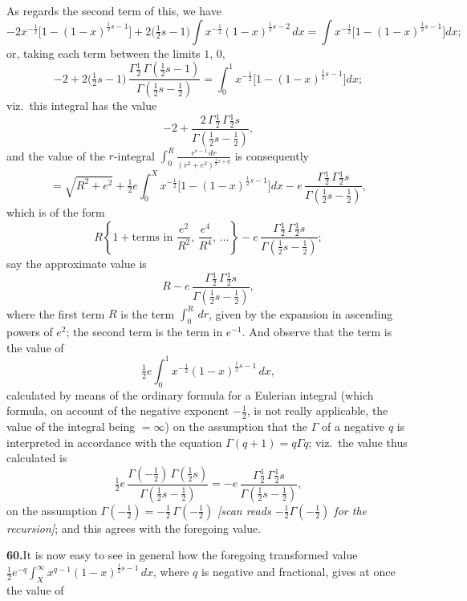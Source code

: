 \documentclass[11pt]{article}
\begin{document}
As regards the second term of this, we have
\[
-2x^{-\frac{1}{2}}\bigl[1-(1-x)^{\frac{1}{2}s-1}\bigr] + 2\bigl(\tfrac{1}{2}s-1\bigr)\int x^{-\frac{1}{2}}(1-x)^{\frac{1}{2}s-2}\,dx
= \int x^{-\frac{1}{2}}\bigl[1-(1-x)^{\frac{1}{2}s-1}\bigr]dx;
\]
or, taking each term between the limits $1$, $0$,
\[
-2 + 2\bigl(\tfrac{1}{2}s-1\bigr)\,\frac{\Gamma\frac{1}{2}\,\Gamma(\frac{1}{2}s-1)}{\Gamma(\frac{1}{2}s-\frac{1}{2})}
= \int_{0}^{1} x^{-\frac{1}{2}}\bigl[1-(1-x)^{\frac{1}{2}s-1}\bigr]dx;
\]
viz.\ this integral has the value
\[
-2 + \frac{2\,\Gamma\tfrac{1}{2}\,\Gamma\tfrac{1}{2}s}{\Gamma(\tfrac{1}{2}s-\tfrac{1}{2})},
\]
and the value of the $r$-integral $\displaystyle\int_{0}^{R}\frac{r^{s-1}\,dr}{(r^{2}+e^{2})^{\frac{1}{2}s+q}}$ is consequently
\[
= \sqrt{R^{2}+e^{2}} + \tfrac{1}{2}e\int_{0}^{X} x^{-\frac{1}{2}}\bigl[1-(1-x)^{\frac{1}{2}s-1}\bigr]dx
- e\,\frac{\Gamma\tfrac{1}{2}\,\Gamma\tfrac{1}{2}s}{\Gamma(\tfrac{1}{2}s-\tfrac{1}{2})},
\]
which is of the form
\[
R\left\{1 + \text{terms in } \frac{e^{2}}{R^{2}},\, \frac{e^{4}}{R^{4}},\,\ldots \right\} - e\,\frac{\Gamma\tfrac{1}{2}\,\Gamma\tfrac{1}{2}s}{\Gamma(\tfrac{1}{2}s-\tfrac{1}{2})};
\]
say the approximate value is
\[
R - e\,\frac{\Gamma\tfrac{1}{2}\,\Gamma\tfrac{1}{2}s}{\Gamma(\tfrac{1}{2}s-\tfrac{1}{2})},
\]
where the first term $R$ is the term $\displaystyle\int_{0}^{R}\,dr$, given by the expansion in ascending powers of $e^{2}$; the second term is the term in $e^{-1}$. And observe that the term is the value of
\[
\tfrac{1}{2}e\int_{0}^{1} x^{-\frac{1}{2}}(1-x)^{\frac{1}{2}s-1}\,dx,
\]
calculated by means of the ordinary formula for a Eulerian integral (which formula, on account of the negative exponent $-\tfrac{1}{2}$, is not really applicable, the value of the integral being $=\infty$) on the assumption that the $\Gamma$ of a negative $q$ is interpreted in accordance with the equation $\Gamma(q+1)=q\Gamma q$; viz.\ the value thus calculated is
\[
\tfrac{1}{2}e\,\frac{\Gamma(-\tfrac{1}{2})\,\Gamma(\tfrac{1}{2}s)}{\Gamma(\tfrac{1}{2}s-\tfrac{1}{2})}
= -e\,\frac{\Gamma\tfrac{1}{2}\,\Gamma\tfrac{1}{2}s}{\Gamma(\tfrac{1}{2}s-\tfrac{1}{2})},
\]
on the assumption $\Gamma(-\tfrac{1}{2})=-\tfrac{1}{2}\,\Gamma(-\tfrac{1}{2})$ \emph{[scan reads $-\tfrac{1}{2}\Gamma(-\tfrac{1}{2})$ for the recursion]}; and this agrees with the foregoing value.

\bigskip

\noindent\textbf{60.}\quad It is now easy to see in general how the foregoing transformed value
$\tfrac{1}{2}e^{-q}\displaystyle\int_{X}^{\infty} x^{q-1}(1-x)^{\frac{1}{2}s-1}\,dx$, where $q$ is negative and fractional, gives at once the value of
\end{document}
